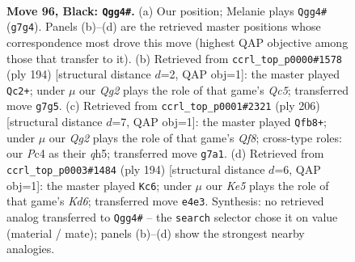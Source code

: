 \documentclass[11pt]{article}
\begin{document}
\clearpage

\begin{figure}[p]\centering
\begin{subfigure}{0.46\textwidth}\centering
\resizebox{\linewidth}{!}{%
\newchessgame
\chessboard[
  setfen={8/6q1/8/8/2p1k2K/8/8/3q4 b - - 3 96},
  showmover=false,
  pgfstyle=straightmove, color=movearrow, markmove={g7-g4}
]}
\caption{}
\end{subfigure}\hfill
\begin{subfigure}{0.46\textwidth}\centering
\resizebox{\linewidth}{!}{%
\newchessgame
\chessboard[
  setfen={4Q3/8/8/2Q5/8/6K1/3k4/8 w - - 3 98},
  showmover=false,
  pgfstyle=straightmove, color=movearrow, markmove={c5-c2}
]}
\caption{}
\end{subfigure}
\\[4pt]
\begin{subfigure}{0.46\textwidth}\centering
\resizebox{\linewidth}{!}{%
\newchessgame
\chessboard[
  setfen={5Q2/1Q1K4/8/7q/8/6k1/8/8 w - - 2 104},
  showmover=false,
  pgfstyle=straightmove, color=movearrow, markmove={f8-b8}
]}
\caption{}
\end{subfigure}\hfill
\begin{subfigure}{0.46\textwidth}\centering
\resizebox{\linewidth}{!}{%
\newchessgame
\chessboard[
  setfen={1k6/8/3K4/Q7/8/8/8/8 w - - 9 98},
  showmover=false,
  pgfstyle=straightmove, color=movearrow, markmove={d6-c6}
]}
\caption{}
\end{subfigure}
\caption{\textbf{Move 96, Black: \texttt{Qgg4\#}.} (a) Our position; Melanie plays \texttt{Qgg4\#} (\texttt{g7g4}). Panels (b)--(d) are the retrieved master positions whose correspondence most drove this move (highest QAP objective among those that transfer to it). (b) Retrieved from \texttt{ccrl\_top\_p0000\#1578} (ply 194) [structural distance $d$=2, QAP obj=1]: the master played \texttt{Qc2+}; under $\mu$ our \emph{Qg2} plays the role of that game's \emph{Qc5}; transferred move \texttt{g7g5}. (c) Retrieved from \texttt{ccrl\_top\_p0001\#2321} (ply 206) [structural distance $d$=7, QAP obj=1]: the master played \texttt{Qfb8+}; under $\mu$ our \emph{Qg2} plays the role of that game's \emph{Qf8}; cross-type roles: our \emph{P}c4 as their \emph{q}h5; transferred move \texttt{g7a1}. (d) Retrieved from \texttt{ccrl\_top\_p0003\#1484} (ply 194) [structural distance $d$=6, QAP obj=1]: the master played \texttt{Kc6}; under $\mu$ our \emph{Ke5} plays the role of that game's \emph{Kd6}; transferred move \texttt{e4e3}. Synthesis: no retrieved analog transferred to \texttt{Qgg4\#} -- the \texttt{search} selector chose it on value (material / mate); panels (b)--(d) show the strongest nearby analogies.}
\label{fig:thought-m191}
\end{figure}
\end{document}
